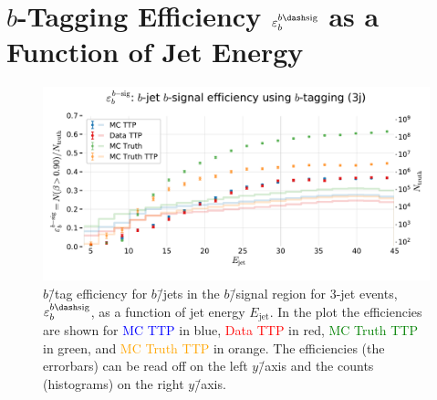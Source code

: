 \FloatBarrier
\section[b-tag Efficiency for b-Jets in the b-Signal Region for 3-jet events]{$b$-Tagging Efficiency $\varepsilon_b^{b\dash\mathrm{sig}}$ as a Function of Jet Energy}
\begin{figure}
  \centerfloat
  \includegraphics[width=1.1\textwidth, trim=20 30 0 40, clip]{figures/quarks/eff_b_bsig-down_sample=1.00-ML_vars=vertex-selection=b-ejet_min=4-n_iter_RS_lgb=99-n_iter_RS_xgb=9-cdot_cut=0.90-version=19.pdf}
  \vspace{-3mm}
  \caption[$b$\=/Tagging Efficiency $\varepsilon_b^{b\dash\mathrm{sig}}$ as a Function of Jet Energy]
          {$b$\=/tag efficiency for $b$\=/jets in the $b$\=/signal region for 3-jet events, $\varepsilon_b^{b\dash\mathrm{sig}}$, as a function of jet energy $E_\mathrm{jet}$. In the plot the efficiencies are shown for \textcolor{blue}{MC TTP} in blue, \textcolor{red}{Data TTP} in red, \textcolor{green}{MC Truth TTP} in green, and \textcolor{orange}{MC Truth TTP} in orange. The efficiencies (the errorbars) can be read off on the left $y$\=/axis and the counts (histograms) on the right $y$\=/axis.} 
\end{figure}
\vspace{3cm}
